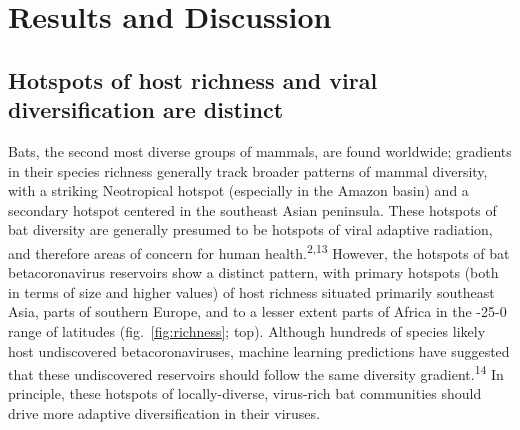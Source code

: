 \documentclass[11pt]{article}
\begin{document}
\hypertarget{results-and-discussion}{%
\section{Results and Discussion}\label{results-and-discussion}}

\hypertarget{hotspots-of-host-richness-and-viral-diversification-are-distinct}{%
\subsection{Hotspots of host richness and viral diversification are
distinct}\label{hotspots-of-host-richness-and-viral-diversification-are-distinct}}

Bats, the second most diverse groups of mammals, are found worldwide;
gradients in their species richness generally track broader patterns of
mammal diversity, with a striking Neotropical hotspot (especially in the
Amazon basin) and a secondary hotspot centered in the southeast Asian
peninsula. These hotspots of bat diversity are generally presumed to be
hotspots of viral adaptive radiation, and therefore areas of concern for
human health.\textsuperscript{2,13} However, the hotspots of bat
betacoronavirus reservoirs show a distinct pattern, with primary
hotspots (both in terms of size and higher values) of host richness
situated primarily southeast Asia, parts of southern Europe, and to a
lesser extent parts of Africa in the -25-0 range of latitudes
(fig.~\ref{fig:richness}; top). Although hundreds of species likely host
undiscovered betacoronaviruses, machine learning predictions have
suggested that these undiscovered reservoirs should follow the same
diversity gradient.\textsuperscript{14} In principle, these hotspots of
locally-diverse, virus-rich bat communities should drive more adaptive
diversification in their viruses.
\end{document}
